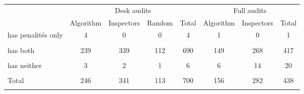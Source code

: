 \begin{tabular}{l*{7}{c}}
\toprule
            &\multicolumn{4}{c}{Desk audits}                    &\multicolumn{3}{c}{Full audits}       \\
            &   Algorithm&  Inspectors&      Random&       Total&   Algorithm&  Inspectors&       Total\\
\midrule
has penalités only&           4&           0&           0&           4&           1&           0&           1\\
            &            &            &            &            &            &            &            \\
\addlinespace
has both    &         239&         339&         112&         690&         149&         268&         417\\
            &            &            &            &            &            &            &            \\
\addlinespace
has neither &           3&           2&           1&           6&           6&          14&          20\\
            &            &            &            &            &            &            &            \\
\addlinespace
Total       &         246&         341&         113&         700&         156&         282&         438\\
            &            &            &            &            &            &            &            \\
\bottomrule
\end{tabular}
